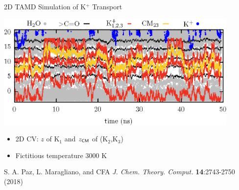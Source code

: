 \begin{frame}{2D TAMD Simulation of K$^+$ Transport}
\begin{center}
\includegraphics[width=0.9\textwidth]{fullions-crop.png}
\end{center}
\begin{itemize}
\item 2D CV: $z$ of K$_1$ and $z_{\sf CM}$ of (K$_2$,K$_3$)
\item Fictitious temperature 3000 K
\end{itemize}
{\tiny \textcolor{red!80!black}{S. A. Paz, L. Maragliano, and CFA {\em J. Chem. Theory. Comput.} {\bf 14}:2743-2750 (2018)}}
\end{frame} 

